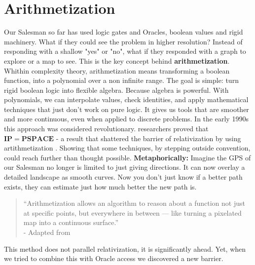 \documentclass[12pt]{report}
\begin{document}
\section{Arithmetization}
Our Salesman so far has used logic gates and Oracles, boolean values and rigid machinery.
What if they could see the problem in higher resolution?
Instead of responding with a shallow "yes" or "no", what if they responded with a graph to explore or a map to see.
This is the key concept behind \textbf{arithmetization}.
Whithin complexity theory, arithmetization means transforming a boolean function, into a polynomial over a non infinite range.
The goal is simple: turn rigid boolean logic into flexible algebra.
Because algebra is powerful.
With polynomials, we can interpolate values, check identities, and apply mathematical techniques that just don't work on pure logic.
It gives us tools that are smoother and more continuous, even when applied to discrete problems.
In the early 1990s this approach was considered revolutionary.
researchers proved that $\mathbf{IP = PSPACE}$ - a result that shattered the barrier of relativization by using artithmetization \citep{arora2009}.
Showing that some techniques, by stepping outside convention, could reach further than thought possible.
\textbf{Metaphorically:}
Imagine the GPS of our Salesman no longer is limited to just giving directions.
It can now overlay a detailed landscape as smooth curves.
Now you don't just know if a better path exists, they can estimate just how much better the new path is.
\begin{quote}
    “Arithmetization allows an algorithm to reason about a function not just at specific points, but everywhere in between — like turning a pixelated map into a continuous surface.”\\
    - Adapted from \cite[Ch. 20.4]{arora2009}
\end{quote}
This method does not parallel relativization, it is significantly ahead.
Yet, when we tried to combine this with Oracle access we discovered a new barrier.
\end{document}
